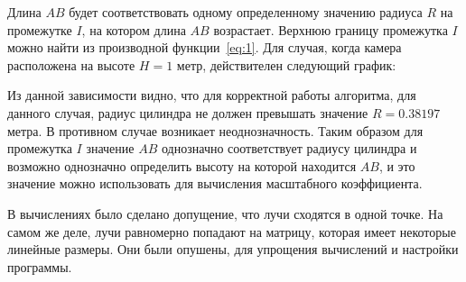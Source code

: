 \begin{figure}[ht!]
\end{figure}

Длина \(AB\) будет соответствовать одному определенному значению радиуса \(R\) на промежутке \(I\), на котором длина \(AB\) возрастает. Верхнюю границу промежутка \(I\) можно найти из производной функции~\eqref{eq:1}.
Для случая, когда камера расположена на высоте \(H = 1\) метр, действителен следующий график:

\begin{figure}[ht!]
\end{figure}

Из данной зависимости видно, что для корректной работы алгоритма, для данного случая, радиус цилиндра не должен превышать значение \(R=0.38197\) метра. В противном случае возникает неоднозначность.
Таким образом для промежутка \(I\) значение \(AB\) однозначно соответствует радиусу цилиндра и возможно однозначно определить высоту на которой находится \(AB\), и это значение можно использовать для вычисления масштабного коэффициента.

В вычислениях было сделано допущение, что лучи сходятся в одной точке. На самом же деле, лучи равномерно попадают на матрицу, которая имеет некоторые линейные размеры. Они были опушены, для упрощения вычислений и настройки программы.

